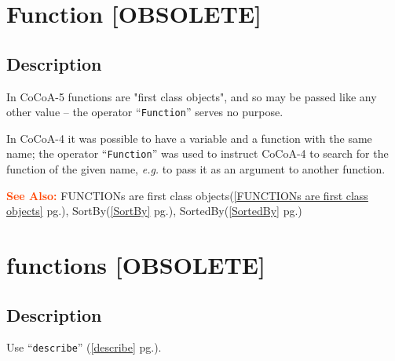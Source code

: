 \documentclass[a4paper]{mybook}
\newenvironment{command}{}{} %
\newcommand\SeeAlso{\par\textcolor{OrangeRed}{\textbf{\large See Also: }}}
\begin{document}
\section{Function [OBSOLETE]}
\label{Function [OBSOLETE]}
\begin{command} %



\subsection*{Description}

In CoCoA-5 functions are "first class objects", and so may be passed
like any other value -- the operator ``\verb&Function&'' serves no purpose.
\par 
In CoCoA-4 it was possible to have a variable and a function with the
same name; the operator ``\verb&Function&'' was used to instruct CoCoA-4
to search for the function of the given name, \textit{e.g.} to pass it as
an argument to another function.

\SeeAlso %
  FUNCTIONs are first class objects(\ref{FUNCTIONs are first class objects} pg.\pageref{FUNCTIONs are first class objects}), 
    SortBy(\ref{SortBy} pg.\pageref{SortBy}), 
    SortedBy(\ref{SortedBy} pg.\pageref{SortedBy})
\end{command} %

\section{functions [OBSOLETE]}
\label{functions [OBSOLETE]}
\begin{command} %



\subsection*{Description}

Use ``\verb&describe&'' (\ref{describe} pg.\pageref{describe}).

\end{command} %
\end{document}

